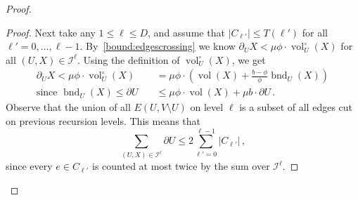 \documentclass[epsfig,letter,11pt]{article}
\numberwithin{equation}{section}
\DeclareMathOperator{\vol}{vol}
\newcommand{\unbor}[2]{\operatorname{bnd}_{#2} (#1)}
\newcommand{\unvolc}[2]{\operatorname{vol}_{#2}^\circ (#1)}
\newcommand{\uncut}[2]{{\partial}_{#2} #1}
\newcommand{\uncutg}[1]{{\partial} #1}
\begin{document}
\begin{proof}
\begin{proof}
Next take any $1 \le \ell \le D$, and assume that $|C_{\ell'}|\le T(\ell')$ for all $\ell'=0,\dots, \ell-1$. By~\eqref{bound:edgescrossing} we know $\uncut{X}{U} < \mu \phi \cdot \unvolc{X}{U}$ for all $(U,X) \in \mathcal{I}^\ell$. Using the definition of $\unvolc{X}{U}$, we get
	\begin{align}
		\uncut{X}{U}  < \mu \phi \cdot \unvolc{X}{U} & =  \mu \phi \cdot \left(\vol(X) + \frac{b-\phi}{\phi}\unbor{X}{U}\right) \\
		\text{since $\unbor{X}{U} \le \uncutg{U}$}\quad & \le \mu \phi \cdot \vol(X) + \mu b \cdot \uncutg{U} \, . \label{bound:cutedges}
	\end{align}
	Observe that the union of all $E(U , V \setminus U)$ on level $\ell$ is a subset of all edges cut on previous recursion levels. This means that
	\begin{equation}
		\sum_{(U,X) \in \mathcal{I}^\ell} \uncutg{U} \leq 2 \sum_{\ell' =0}^{\ell-1} |C_{\ell'}| \, ,\label{bound:cutedges_sum}
	\end{equation}
	since every $e \in C_{\ell'}$ is counted at most twice by the sum over $\mathcal{I}^\ell$.


\end{proof}
\end{proof}
\end{document}
